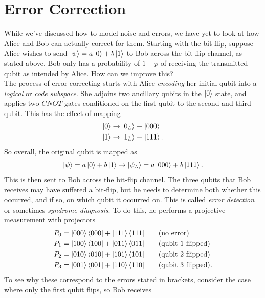 \documentclass[12pt,a4paper]{report}
\numberwithin{equation}{section}
\newcommand{\ketbra}[2]{\ket{#1}\bra{#2}}
\newcommand{\ketbras}[1]{\ketbra{#1}{#1}}
\theoremstyle{definition}
\theoremstyle{theorem}
\theoremstyle{theorem}
\theoremstyle{example}
\theoremstyle{definition}
\begin{document}
\section{Error Correction}
While we've discussed how to model noise and errors, we have yet to look at how Alice and Bob can actually correct for them. Starting with the bit-flip, suppose Alice wishes to send $\ket{\psi}=a\ket{0}+b\ket{1}$ to Bob across the bit-flip channel, as stated above. Bob only has a probability of $1-p$ of receiving the transmitted qubit as intended by Alice. How can we improve this?\\
The process of error correcting starts with Alice \textit{encoding} her initial qubit into a \textit{logical} or \textit{code subspace}. She adjoins two ancillary qubits in the $\ket{0}$ state, and applies two $CNOT$ gates conditioned on the first qubit to the second and third qubit. This has the effect of mapping
\begin{equation}
	\begin{aligned}
		\ket{0}&\to\ket{0_{L}}\equiv\ket{000}\\
		\ket{1}&\to\ket{1_{L}}\equiv\ket{111}.
	\end{aligned}
\end{equation}
So overall, the original qubit is mapped as
\begin{equation}
	\ket{\psi}=a\ket{0}+b\ket{1}\to\ket{\psi_{L}}=a\ket{000}+b\ket{111}.
\end{equation}
This is then sent to Bob across the bit-flip channel. The three qubits that Bob receives may have suffered a bit-flip, but he needs to determine both whether this occurred, and if so, on which qubit it occurred on. This is called \textit{error detection} or sometimes \textit{syndrome diagnosis}. To do this, he performs a projective measurement with projectors
\begin{equation}
	\begin{aligned}
		P_{0}&=\ketbras{000}+\ketbras{111}&\quad&\text{(no error)}\\
		P_{1}&=\ketbras{100}+\ketbras{011}&\quad&\text{(qubit 1 flipped)}\\
		P_{2}&=\ketbras{010}+\ketbras{101}&\quad&\text{(qubit 2 flipped)}\\
		P_{3}&=\ketbras{001}+\ketbras{110}&\quad&\text{(qubit 3 flipped)}.
	\end{aligned}
\end{equation}
To see why these correspond to the errors stated in brackets, consider the case where only the first qubit flips, so Bob receives
\end{document}
